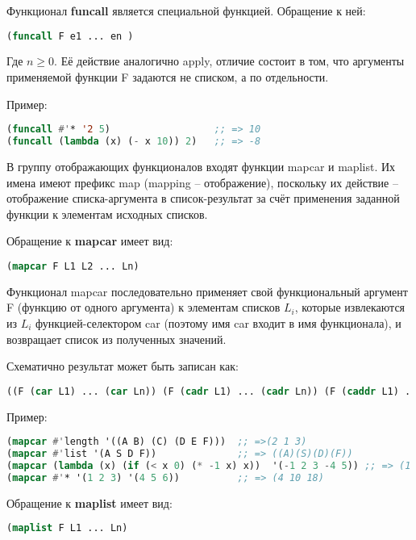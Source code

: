 \documentclass[a4paper,oneside,12pt]{extreport}
\begin{document}
Функционал \textbf{funcall} является специальной функцией.
Обращение к ней:

\begin{lstlisting}[language=Lisp] 
(funcall F e1 ... en )
\end{lstlisting}

Где $n \geq 0$. Её действие аналогично apply, отличие состоит в том, что аргументы
применяемой функции F задаются не списком, а по отдельности.

Пример:

\begin{lstlisting}[language=Lisp] 
(funcall #'* '2 5)                  ;; => 10
(funcall (lambda (x) (- x 10)) 2)   ;; => -8    
\end{lstlisting}
    
В группу отображающих функционалов входят функции mapcar и maplist.
Их имена имеют префикс map (mapping – отображение), поскольку их
действие – отображение списка-аргумента в список-результат 
за счёт применения заданной функции к элементам исходных списков.

Обращение к \textbf{mapcar} имеет вид:

\begin{lstlisting}[language=Lisp] 
(mapcar F L1 L2 ... Ln)
\end{lstlisting}

Функционал mapcar последовательно применяет свой функциональный аргумент F (функцию
от одного аргумента) к элементам списков $L_i$, которые извлекаются из $L_i$
функцией-селектором car (поэтому имя car входит в имя функционала),
и возвращает список из полученных значений. 

Схематично результат может быть записан как:
\begin{lstlisting}[language=Lisp] 
((F (car L1) ... (car Ln)) (F (cadr L1) ... (cadr Ln)) (F (caddr L1) ... (caddr Ln)) ...).
\end{lstlisting}

Пример:
\begin{lstlisting}[language=Lisp] 
(mapcar #'length '((A B) (C) (D E F)))  ;; =>(2 1 3)
(mapcar #'list '(A S D F))              ;; => ((A)(S)(D)(F))
(mapcar (lambda (x) (if (< x 0) (* -1 x) x))  '(-1 2 3 -4 5)) ;; => (1 2 3 4 5)
(mapcar #'* '(1 2 3) '(4 5 6))          ;; => (4 10 18)
\end{lstlisting}


Обращение к \textbf{maplist} имеет вид:
\begin{lstlisting}[language=Lisp] 
(maplist F L1 ... Ln)
\end{lstlisting}
\end{document}
